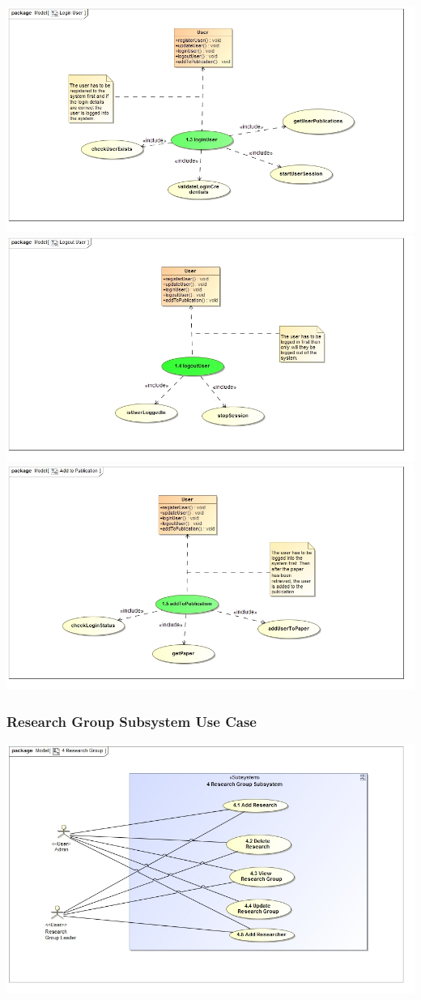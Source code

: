 \documentclass{article}
\begin{document}
				\includegraphics[width=\textwidth]{LoginUser}
				\includegraphics[width=\textwidth]{LogoutUser}
				\includegraphics[width=\textwidth]{AddtoPublication}
			\subsubsection{Research Group Subsystem Use Case}
				\includegraphics[width=\textwidth]{ResearchGroup}
\end{document}
